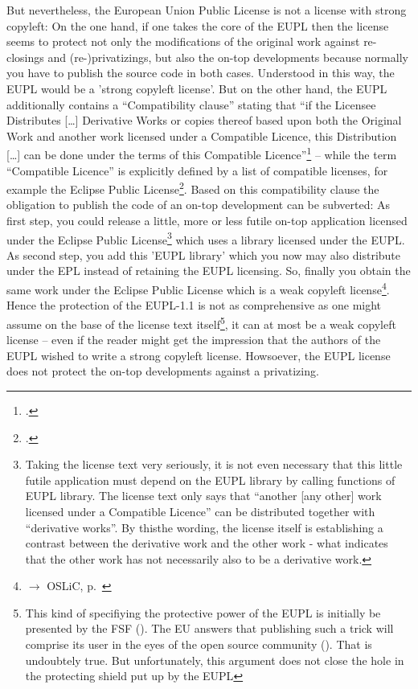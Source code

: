 But nevertheless, the European Union Public License is not a license with strong
copyleft: On the one hand, if one takes the core of the EUPL then the license
seems to protect not only the modifications of the original work against
re-closings and (re-)privatizings, but also the on-top developments because
normally you have to publish the source code in both cases. Understood in this
way, the EUPL would be a 'strong copyleft license'. But on the other hand, the
EUPL additionally contains a \enquote{Compatibility clause} stating that
\enquote{if the Licensee Distributes [\ldots] Derivative Works or copies thereof
based upon both the Original Work and another work licensed under a Compatible
Licence, this Distribution [\ldots] can be done under the terms of this
Compatible Licence}\footcite[cf.][\nopage wp\ §5]{EuplLicense2007en} -- while
the term \enquote{Compatible Licence} is explicitly defined by a list of
compatible licenses, for example the Eclipse Public
License\footcite[cf.][\nopage wp\ Appendix]{EuplLicense2007en}. Based on this
compatibility clause the obligation to publish the code of an on-top development
can be subverted: As first step, you could release a little, more or less futile
on-top application licensed under the Eclipse Public License\footnote{Taking the
license text very seriously, it is not even necessary that this little futile
application must depend on the EUPL library by calling functions of EUPL
library. The license text only says that \enquote{another [any other] work
licensed under a Compatible Licence} can be distributed together with
\enquote{derivative works}. By thisthe wording, the license itself is
establishing a contrast between the derivative work and the other work - what
indicates that the other work has not necessarily also to be a derivative work.}
which uses a library licensed under the EUPL. As second step, you add this 'EUPL
library' which you now may also distribute under the EPL instead of retaining
the EUPL licensing. So, finally you obtain the same work under the Eclipse
Public License which is a weak copyleft license\footnote{$\rightarrow$ OSLiC,
p.\ \pageref{sec:ProtectingPowerOfEpl}}. Hence the protection of the EUPL-1.1 is
not as comprehensive as one might assume on the base of the license text
itself\footnote{This kind of specifiying the protective power of the EUPL is
initially be presented by the FSF (\cite[cf.][wp\ section 'European Union
Public License']{FsfEuplStatement2013a}). The EU answers that publishing such a
trick will comprise its user in the eyes of the open source community
(\cite[cf.][wp]{FsfEuplRecomment2013}). That is undoubtely true. But
unfortunately, this argument does not close the hole in the protecting shield
put up by the EUPL}, it can at most be a weak copyleft license -- even if the
reader might get the impression that the authors of the EUPL wished to write a
strong copyleft license. Howsoever, the EUPL license does not protect the on-top
developments against a privatizing.

